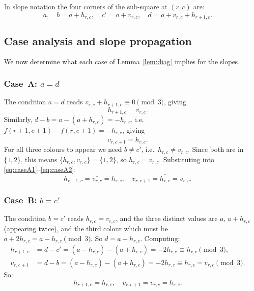 \documentclass{article}
\newcommand{\comp}[1]{\bar{#1}}   %
\begin{document}
In slope notation the four corners of the sub-square at
$(r,c)$ are:
\[
  a,\quad b = a+h_{r,c},\quad
  c' = a+v_{r,c},\quad
  d = a+v_{r,c}+h_{r+1,c}.
\]

\subsection{Case analysis and slope propagation}
\label{subsec:cases}

We now determine what each case of Lemma~\ref{lem:diag} implies
for the slopes.

\subsubsection{Case~A: $a = d$}

The condition $a = d$ reads $v_{r,c}+h_{r+1,c}\equiv 0\pmod3$,
giving
\begin{equation}
  h_{r+1,c} = \comp{v_{r,c}}.
  \label{eq:caseA1}
\end{equation}
Similarly, $d - b = a - (a+h_{r,c}) = -h_{r,c}$, i.e.\
$f(r+1,c+1)-f(r,c+1) = -h_{r,c}$, giving
\begin{equation}
  v_{r,c+1} = \comp{h_{r,c}}.
  \label{eq:caseA2}
\end{equation}
For all three colours to appear we need $b\neq c'$, i.e.\
$h_{r,c}\neq v_{r,c}$.  Since both are in $\{1,2\}$, this
means $\{h_{r,c},v_{r,c}\}=\{1,2\}$, so
$h_{r,c} = \comp{v_{r,c}}$.  Substituting into
\eqref{eq:caseA1}--\eqref{eq:caseA2}:
\begin{equation}
  \boxed{h_{r+1,c} = \comp{v_{r,c}} = h_{r,c},
  \quad
  v_{r,c+1} = \comp{h_{r,c}} = v_{r,c}.}
  \label{eq:caseA}
\end{equation}

\subsubsection{Case~B: $b = c'$}

The condition $b = c'$ reads $h_{r,c} = v_{r,c}$, and the
three distinct values are $a$, $a+h_{r,c}$ (appearing twice),
and the third colour which must be $a+2h_{r,c} = a-h_{r,c}
\pmod3$.  So $d = a-h_{r,c}$.  Computing:
\begin{align}
  h_{r+1,c} &= d - c' = (a-h_{r,c}) - (a+h_{r,c})
               = -2h_{r,c}\equiv h_{r,c}\pmod3,
  \label{eq:caseB1}\\
  v_{r,c+1} &= d - b = (a-h_{r,c}) - (a+h_{r,c})
               = -2h_{r,c}\equiv h_{r,c} = v_{r,c}\pmod3.
  \label{eq:caseB2}
\end{align}
So:
\begin{equation}
  \boxed{h_{r+1,c} = h_{r,c},
  \quad
  v_{r,c+1} = v_{r,c} = h_{r,c}.}
  \label{eq:caseB}
\end{equation}
\end{document}
